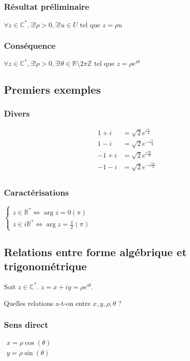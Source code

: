 \documentclass[12pt,a4paper,french]{book}
\begin{document}
			\subsubsection{Résultat préliminaire}
			$\forall z \in \mathbb{C}^\ast, \exists! \rho > 0, \exists! u \in U \mbox{ tel que } z = \rho u$
			\subsubsection{Conséquence}
			$\forall z \in \mathbb{C}^\ast, \exists! \rho >0, \exists! \theta \in \mathbb{R} \setminus 2\pi \mathbb{Z} \mbox{ tel que } z = \rho e^{i\theta}$
		\subsection{Premiers exemples}
			\subsubsection{Divers}
			\begin{equation*}
				\begin{split}
					1+i &= \sqrt{2}e^{i\frac{\pi}{4}} \\
					1-i &= \sqrt{2}e^{-i\frac{\pi}{4}} \\
					-1+i &= \sqrt{2}e^{i\frac{3\pi}{4}} \\
					-1-i &= \sqrt{2}e^{-i\frac{5\pi}{4}} \\
				\end{split}
			\end{equation*}
			\subsubsection{Caractérisations}
			$\left\{\begin{array}{ll}
				z \in \mathbb{R}^\ast \Leftrightarrow \arg{z} = 0 (\pi)\\
				z \in i\mathbb{R}^\ast \Leftrightarrow \arg{z} = \frac{\pi}{2} (\pi)
			\end{array}\right.$
		\subsection{Relations entre forme algébrique et trigonométrique}
		Soit $z \in \mathbb{C}^\ast$. $z = x + iy = \rho e^{i\theta}$.
		
		Quelles relations a-t-on entre $x,y,\rho,\theta$ ?
			\subsubsection{Sens direct}
			$\begin{array}{ll}
				x = \rho \cos(\theta) \\
				y = \rho \sin(\theta)
			\end{array}$
\end{document}
